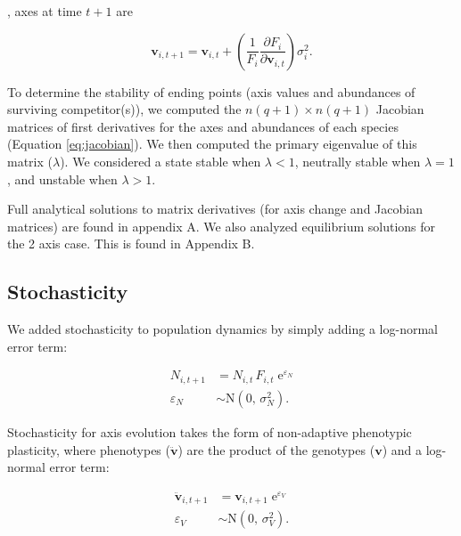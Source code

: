\cite{DeVries2019}


, axes at time $t+1$ are

\begin{equation} \label{eq:axis-change}
    \mathbf{v}_{i,t+1} = \mathbf{v}_{i,t} + \left( \frac{1}{F_i}
        \frac{\partial F_i}{\partial \mathbf{v}_{i,t}} \right) \sigma^2_i
    \textrm{.}
\end{equation}

To determine the stability of ending points (axis values and abundances of
surviving competitor(s)), we computed the $n (q+1) \times n (q+1)$ Jacobian matrices
of first derivatives for the axes and abundances of each species (Equation \ref{eq:jacobian}).
We then computed the primary eigenvalue of this matrix ($\lambda$).
We considered a state stable when $\lambda < 1$,
neutrally stable when $\lambda = 1$,
and unstable when $\lambda > 1$.

Full analytical solutions to matrix derivatives (for axis change and
Jacobian matrices) are found in appendix A.
We also analyzed equilibrium solutions for the 2 axis case.
This is found in Appendix B.


\subsection*{Stochasticity}

We added stochasticity to population dynamics by simply adding 
a log-normal error term:

\begin{equation} \label{eq:N-stochasticity}
\begin{split}
    N_{i,t+1} &= N_{i,t} \, F_{i,t} \; \text{e}^{\varepsilon_N} \\
    \varepsilon_N &\sim \text{N}(0, \, \sigma^2_N)
    \text{.}
\end{split}
\end{equation}


Stochasticity for axis evolution takes the form of non-adaptive
phenotypic plasticity,
where phenotypes ($\mathbf{\ddot{v}}$) are the product of the
genotypes ($\mathbf{v}$) and a log-normal error term:

\begin{equation} \label{eq:V-stochasticity}
\begin{split}
    \mathbf{\ddot{v}}_{i,t+1} &= \mathbf{v}_{i,t+1} \; \text{e}^{\varepsilon_V} \\
    \varepsilon_V &\sim \text{N}(0, \, \sigma^2_V)
    \text{.}
\end{split}
\end{equation}

